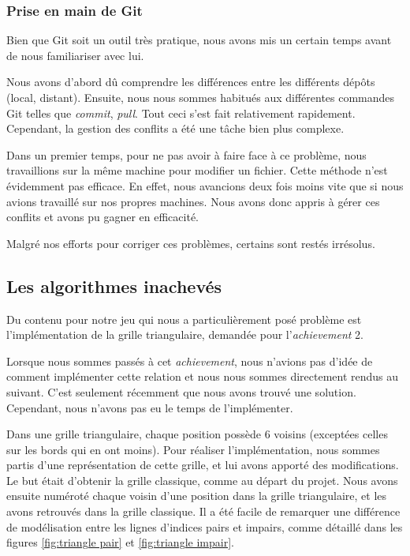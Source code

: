 \documentclass[a4paper]{article}
\begin{document}
\subsubsection{Prise en main de Git}
\label{pb git}

Bien que Git soit un outil très pratique, nous avons mis un certain temps avant de nous familiariser avec lui.

Nous avons d'abord dû comprendre les différences entre les différents dépôts (local, distant). Ensuite, nous nous sommes habitués aux différentes commandes Git telles que \emph{commit}, \emph{pull}. Tout ceci s'est fait relativement rapidement. Cependant, la gestion des conflits a été une tâche bien plus complexe.

Dans un premier temps, pour ne pas avoir à faire face à ce problème, nous travaillions sur la même machine pour modifier un fichier. Cette méthode n'est évidemment pas efficace. En effet, nous avancions deux fois moins vite que si nous avions travaillé sur nos propres machines. Nous avons donc appris à gérer ces conflits et avons pu gagner en efficacité.

\vspace{0.5cm}

Malgré nos efforts pour corriger ces problèmes, certains sont restés irrésolus.

\subsection{Les algorithmes inachevés}
\label{algos inachevés}

Du contenu pour notre jeu qui nous a particulièrement posé problème est l'implémentation de la grille triangulaire, demandée pour l'\emph{achievement} 2.

Lorsque nous sommes passés à cet \emph{achievement}, nous n'avions pas d'idée de comment implémenter cette relation et nous nous sommes directement rendus au suivant. C'est seulement récemment que nous avons trouvé une solution. Cependant, nous n'avons pas eu le temps de l'implémenter.

\vspace{0.5cm}

Dans une grille triangulaire, chaque position possède 6 voisins (exceptées celles sur les bords qui
en ont moins). Pour réaliser l'implémentation, nous sommes partis d'une représentation de cette grille, et lui avons apporté des modifications. Le but était d'obtenir la grille classique, comme au départ du projet. Nous avons ensuite numéroté chaque voisin d'une position dans la grille triangulaire, et les avons retrouvés dans la grille classique. Il a été facile de remarquer une différence de modélisation entre les lignes d'indices pairs et impairs, comme détaillé dans les figures \ref{fig:triangle pair} et \ref{fig:triangle impair}.
\end{document}
